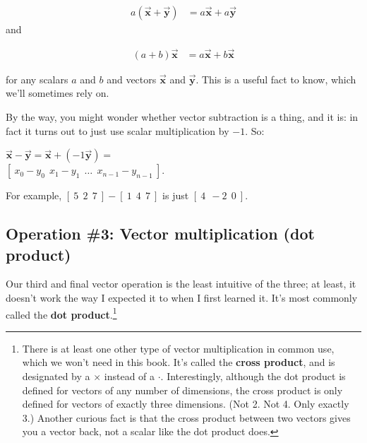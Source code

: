 \vspace{-.15in}
\begin{align*}
a (\overrightarrow{\textbf{x}} + \overrightarrow{\textbf{y}}) &=
a \overrightarrow{\textbf{x}} + a \overrightarrow{\textbf{y}}
\end{align*}
\vspace{-.15in}
and

\vspace{-.15in}
\begin{align*}
(a + b) \overrightarrow{\textbf{x}} &=
a \overrightarrow{\textbf{x}} + b \overrightarrow{\textbf{x}}
\end{align*}
\vspace{-.15in}

for any scalars $a$ and $b$ and vectors $\overrightarrow{\textbf{x}}$ and
$\overrightarrow{\textbf{y}}$. This is a useful fact to know, which we'll
sometimes rely on.

\medskip

By the way, you might wonder whether vector subtraction is a thing, and it is:
in fact it turns out to just use scalar multiplication by $-1$. So:

\vspace{-.15in}
\begin{center}
$\overrightarrow{\textbf{x}} - \overrightarrow{\textbf{y}} =
\overrightarrow{\textbf{x}} + (-1 \overrightarrow{\textbf{y}}) =$ \\
$ [\ x_0 - y_0\ \ x_1 - y_1\ \ \dots \ \ x_{n-1} - y_{n-1}\ ]$.
\end{center}

For example, $[\ 5\ \ 2\ \ 7\ ] - [\ 1\ \ 4\ \ 7\ ]$ is just $[\ 4\ \ -2\ \ 0\ ]$.

\subsection{Operation \#3: Vector multiplication (dot product)}

\label{dotProduct}

Our third and final vector operation is the least intuitive of the three; at
least, it doesn't work the way I expected it to when I first learned it. It's
most commonly called the \textbf{dot product}.\footnote{There is at least one
other type of vector multiplication in common use, which we won't need in this
book. It's called the \textbf{cross product}, and is designated by a $\times$
instead of a $\cdot$. Interestingly, although the dot product is defined for
vectors of any number of dimensions, the cross product is only defined for
vectors of exactly three dimensions. (Not 2. Not 4. Only exactly 3.) Another
curious fact is that the cross product between two vectors gives you a vector
back, not a scalar like the dot product does.}

